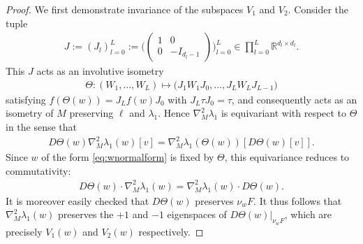 \documentclass{article}
\newcommand{\RB}{\mathbb{R}}
\theoremstyle{plain}
\theoremstyle{definition}
\theoremstyle{remark}
\begin{document}
\begin{proof}
    We first demonstrate invariance of the subspaces $V_1$ and $V_2$. Consider the tuple
    \begin{align}
    J:=(J_l)_{l=0}^L:=\Bigg(\begin{pmatrix} 1 & 0 \\ 0 & -I_{d_l-1}\end{pmatrix}\Bigg)_{l=0}^L\in\prod_{l=0}^L\RB^{d_l\times d_l}.
    \end{align}
    This $J$ acts as an involutive isometry
    \begin{align}\label{eq:Theta}
    \Theta: (W_1,\dots,W_L) \mapsto \big(J_1W_1J_0,\dots,J_LW_LJ_{L-1}\big)
    \end{align}
    satisfying $f(\Theta(w)) = J_Lf(w)J_0$ with $J_L\tau J_0= \tau$, and consequently acts as an isometry of $M$ preserving $\ell$ and $\lambda_1$. Hence $\nabla^2_M\lambda_1$ is equivariant with respect to $\Theta$ in the sense that
    \begin{align}
    D\Theta(w)\nabla^2_M\lambda_1(w)[v] = \nabla^2_M\lambda_1(\Theta(w))[D\Theta(w)[v]].
    \end{align}
    Since $w$ of the form \eqref{eq:wnormalform} is fixed by $\Theta$, this equivariance reduces to commutativity:
    \begin{align}
    D\Theta(w)\cdot \nabla^2_M\lambda_1(w) = \nabla^2_M\lambda_1(w)\cdot D\Theta(w).
    \end{align}
    It is moreover easily checked that $D\Theta(w)$ preserves $\nu_wF$. It thus follows that $\nabla^2_M\lambda_1(w)$ preserves the $+1$ and $-1$ eigenspaces of $D\Theta(w)|_{\nu_wF}$, which are precisely $V_1(w)$ and $V_2(w)$ respectively.


\end{proof}
\end{document}
